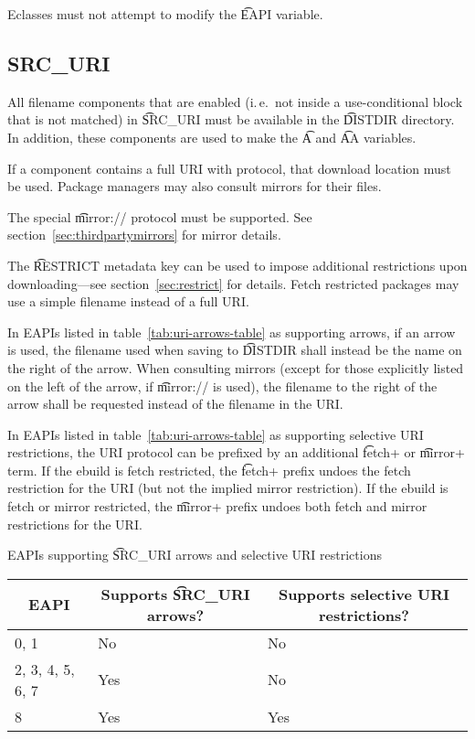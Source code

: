 Eclasses must not attempt to modify the \t{EAPI} variable.

\subsection{SRC_URI}
\label{sec:src-uri-behaviour}

All filename components that are enabled (i.\,e.\ not inside a use-conditional block that is not
matched) in \t{SRC_URI} must be available in the \t{DISTDIR} directory. In addition, these
components are used to make the \t{A} and \t{AA} variables.

If a component contains a full URI with protocol, that download location must be used. Package
managers may also consult mirrors for their files.

The special \t{mirror://} protocol must be supported. See section~\ref{sec:thirdpartymirrors} for
mirror details.

The \t{RESTRICT} metadata key can be used to impose additional restrictions upon downloading---see
section~\ref{sec:restrict} for details. Fetch restricted packages may use a simple filename instead
of a full URI.

 In EAPIs listed in table~\ref{tab:uri-arrows-table} as supporting
arrows, if an arrow is used, the filename used when saving to \t{DISTDIR} shall instead be the name
on the right of the arrow. When consulting mirrors (except for those explicitly listed on the left
of the arrow, if \t{mirror://} is used), the filename to the right of the arrow shall be requested
instead of the filename in the URI.

 In EAPIs listed in table~\ref{tab:uri-arrows-table} as supporting
selective URI restrictions, the URI protocol can be prefixed by an additional \t{fetch+} or
\t{mirror+} term. If the ebuild is fetch restricted, the \t{fetch+} prefix undoes the fetch
restriction for the URI (but not the implied mirror restriction). If the ebuild is fetch or mirror
restricted, the \t{mirror+} prefix undoes both fetch and mirror restrictions for the URI.

\begin{centertable}{EAPIs supporting \t{SRC_URI} arrows and selective URI restrictions}
    \label{tab:uri-arrows-table}
    \begin{tabular}{lll}
      \toprule
      \multicolumn{1}{c}{\textbf{EAPI}} &
      \multicolumn{1}{c}{\textbf{Supports \t{SRC_URI} arrows?}} &
      \multicolumn{1}{c}{\textbf{Supports selective URI restrictions?}} \\
      \midrule
      0, 1              & No  & No  \\
      2, 3, 4, 5, 6, 7  & Yes & No  \\
      8                 & Yes & Yes \\
      \bottomrule
    \end{tabular}
\end{centertable}

